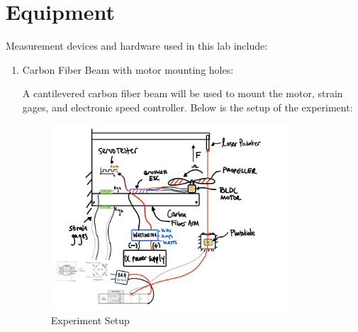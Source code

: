 \documentclass{article}
\begin{document}
\section{Equipment}

Measurement devices and hardware used in this lab include:
\begin{enumerate}
  \item Carbon Fiber Beam with motor mounting holes:
  \vspace{1mm}

  A cantilevered carbon fiber beam will be used to mount the motor, strain gages, and electronic speed controller. Below is the setup of the experiment:

  \begin{figure}[H]
    \centering
    \includegraphics[width = 0.85\textwidth]{finalprojectimages/finalprojectsetup.png}
    \caption{Experiment Setup}
    \label{fig:finalsetup}
  \end{figure}


  \vspace{2.5mm}


\end{enumerate}
\end{document}
